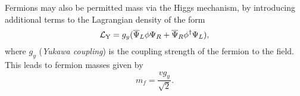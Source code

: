 Fermions may also be permitted mass via the Higgs mechanism, by introducing additional terms to the Lagrangian density of the form 
\begin{equation} \label{eq:LY}
	\mathcal{L}_{\mathrm{Y}} = g_{y}(\overline{\Psi}_L\phi\Psi_R+\overline{\Psi}_R\phi^{\dagger}\Psi_L), 
\end{equation}
where $g_{y}$ (\textit{Yukawa coupling}) is the coupling strength of the fermion to the \BEH{} field.
This leads to fermion masses given by
\begin{equation}
	m_{f}=\frac{vg_{y}}{\sqrt{2}}.
\end{equation}
